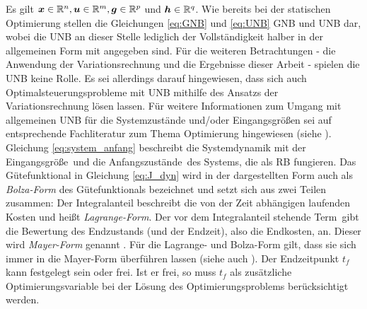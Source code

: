 Es gilt $\boldsymbol{x}\in\mathbb{R}^n, \boldsymbol{u}\in\mathbb{R}^m, \boldsymbol{g}\in\mathbb{R}^p$ und $\boldsymbol{h}\in\mathbb{R}^q$. Wie bereits bei der statischen Optimierung stellen die Gleichungen \ref{eq:GNB} und \ref{eq:UNB} \gls{GNB} und \gls{UNB} dar, wobei die \gls{UNB} an dieser Stelle lediglich der Vollständigkeit halber in der allgemeinen Form mit angegeben sind. Für die weiteren Betrachtungen - die Anwendung der Variationsrechnung und die Ergebnisse dieser Arbeit - spielen die \gls{UNB} keine Rolle. Es sei allerdings darauf hingewiesen, dass sich auch Optimalsteuerungsprobleme mit \gls{UNB} mithilfe des Ansatzs der Variationsrechnung lösen lassen. Für weitere Informationen zum Umgang mit allgemeinen \gls{UNB} für die Systemzustände und/oder Eingangsgrößen sei auf entsprechende Fachliteratur zum Thema Optimierung hingewiesen (siehe \cite{Papageorgiou.2012, Gerdts.2010}). Gleichung \ref{eq:system_anfang} beschreibt die Systemdynamik mit der Eingangsgröße \uoft\,und die Anfangszustände \xzero\,des Systems, die als \gls{RB} fungieren. Das Gütefunktional in Gleichung \ref{eq:J_dyn} wird in der dargestellten Form auch als \textit{Bolza-Form} des Gütefunktionals bezeichnet und setzt sich aus zwei Teilen zusammen: Der Integralanteil beschreibt die von der Zeit abhängigen laufenden Kosten und heißt \textit{Lagrange-Form}. Der vor dem Integralanteil stehende Term \Vofxoftf\,gibt die Bewertung des Endzustands (und der Endzeit), also die Endkosten, an. Dieser wird \textit{Mayer-Form} genannt \cite{KnutGraichen.2012}. Für die Lagrange- und Bolza-Form gilt, dass sie sich immer in die Mayer-Form überführen lassen \cite{KnutGraichen.2012} (siehe auch \cite{Gerdts.2010}). Der Endzeitpunkt $t_f$ kann festgelegt sein oder frei. Ist er frei, so muss $t_f$ als zusätzliche Optimierungsvariable bei der Lösung des Optimierungsproblems berücksichtigt werden. 

